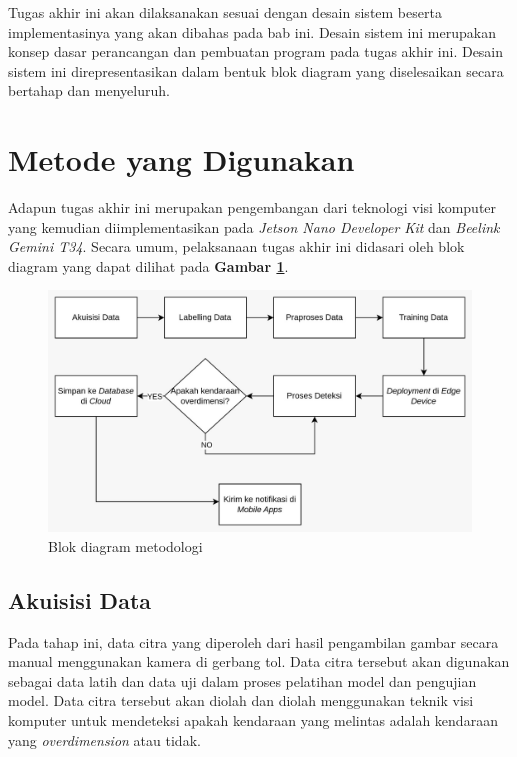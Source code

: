 Tugas akhir ini akan dilaksanakan sesuai dengan desain sistem beserta implementasinya yang akan dibahas pada bab ini. Desain sistem ini merupakan konsep dasar perancangan dan pembuatan program pada tugas akhir ini. Desain sistem ini direpresentasikan dalam bentuk blok diagram yang diselesaikan secara bertahap dan menyeluruh.

\section{Metode yang Digunakan}

Adapun tugas akhir ini merupakan pengembangan dari teknologi visi komputer yang kemudian diimplementasikan pada \emph{Jetson Nano Developer Kit} dan \emph{Beelink Gemini T34}. Secara umum, pelaksanaan tugas akhir ini didasari oleh blok diagram yang dapat dilihat pada \textbf{Gambar \ref{fig:blockdiagrammethod}}.

\begin{figure}[H]
  \centering

  \includegraphics[scale=0.25]{gambar/bab3-block-diagram.jpeg}

  \caption{Blok diagram metodologi}
  \label{fig:blockdiagrammethod}
\end{figure}

\subsection{Akuisisi Data}

Pada tahap ini, data citra yang diperoleh dari hasil pengambilan gambar secara manual menggunakan kamera di gerbang tol. Data citra tersebut akan digunakan sebagai data latih dan data uji dalam proses pelatihan model dan pengujian model. Data citra tersebut akan diolah dan diolah menggunakan teknik visi komputer untuk mendeteksi apakah kendaraan yang melintas adalah kendaraan yang \emph{overdimension} atau tidak.

